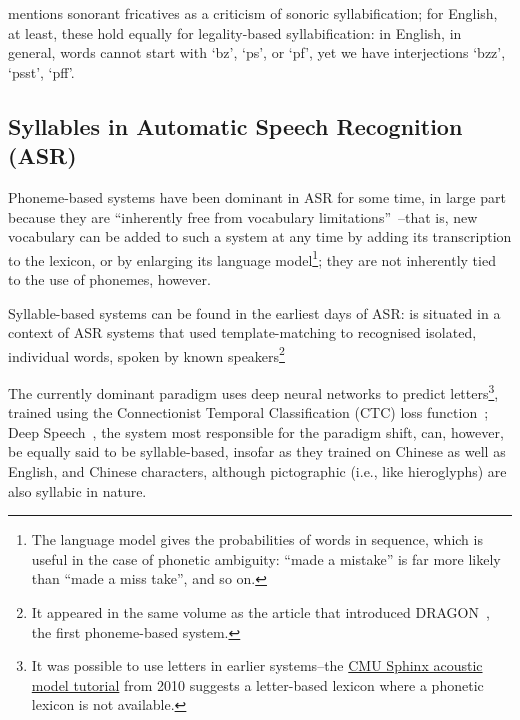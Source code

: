 \documentclass{article}[11pt]
\begin{document}
\citet{saussure_course_1959} mentions sonorant fricatives as a criticism of sonoric syllabification; for English, at least, these hold equally for legality-based syllabification: in English, in general, words cannot start with `bz', `ps', or `pf', yet we have interjections `bzz', `psst', `pff'.


\subsection{Syllables in Automatic Speech Recognition (ASR)}
\label{ssect:syllasr}

Phoneme-based systems have been dominant in ASR for some time, in large part because they are ``inherently free from vocabulary limitations''~\citep{lopes_phoneme_2011}--that is, new vocabulary can be added to such a system at any time by adding its transcription to the lexicon, or by enlarging its language model\footnote{The language model gives the probabilities of words in sequence, which is useful in the case of phonetic ambiguity: ``made a mistake'' is far more likely than ``made a miss take'', and so on.}; they are not inherently tied to the use of phonemes, however.

Syllable-based systems can be found in the earliest days of ASR: \citet{fujimura_syllable_1975} is situated in a context of ASR systems that used template-matching to recognised isolated, individual words, spoken by known speakers\footnote{It appeared in the same volume as the article that introduced DRAGON~\citep{baker_dragon_1975}, the first phoneme-based system.}

The currently dominant paradigm uses deep neural networks to predict letters\footnote{It was possible to use letters in earlier systems--the \href{http://web.archive.org/web/20100814172908/http://cmusphinx.sourceforge.net/wiki/tutorialam}{CMU Sphinx acoustic model tutorial} from 2010 suggests a letter-based lexicon where a phonetic lexicon is not available.}, trained using the Connectionist Temporal Classification (CTC) loss function~\citep{graves_towards_2014}; Deep Speech~\citep{hannun_deep_2014}, the system most responsible for the paradigm shift, can, however, be equally said to be syllable-based, insofar as they trained on Chinese as well as English, and Chinese characters, although pictographic (i.e., like hieroglyphs) are also syllabic in nature.
\end{document}
